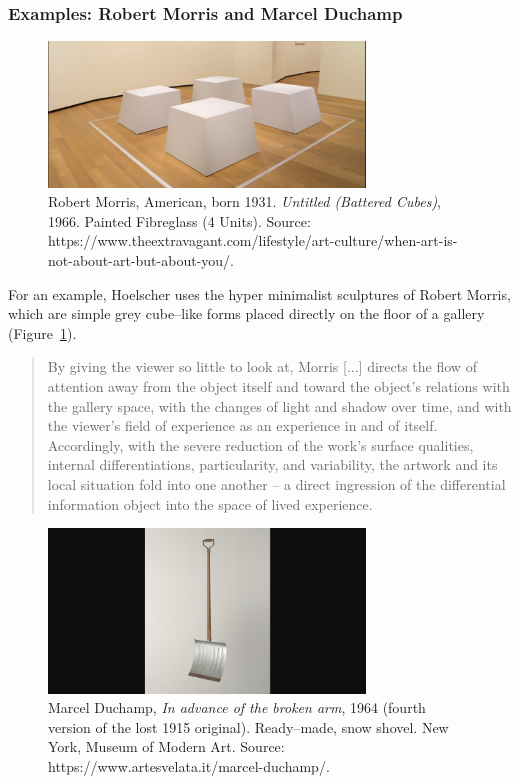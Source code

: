\documentclass[letter:wpaper]{article}
\begin{document}
    \subsubsection{Examples: Robert Morris and Marcel Duchamp}

    \begin{figure}[h]
        \includegraphics[width=3.31in]{robert-morris-cubes.png}
        \caption{Robert Morris, American, born 1931. \emph{Untitled (Battered Cubes)}, 1966. Painted Fibreglass (4 Units). Source: https://www.theextravagant.com/lifestyle/art-culture/when-art-is-not-about-art-but-about-you/.}
        \label{fig:robert-morris-cubes}
    \end{figure}

    For an example, Hoelscher uses the hyper minimalist sculptures of Robert Morris, which are simple grey cube–like forms placed directly on the floor of a gallery (Figure~\ref{fig:robert-morris-cubes}).

    \begin{quote}
        By giving the viewer so little to look at, Morris [...] directs the flow of attention away from the object itself and toward the object's relations with the gallery space, with the changes of light and shadow over time, and with the viewer's field of experience as an experience in and of itself. Accordingly, with the severe reduction of the work's surface qualities, internal differentiations, particularity, and variability, the artwork and its local situation fold into one another – a direct ingression of the differential information object into the space of lived experience. \citep[p.78]{HoelscherArtAsInfrmtn2021}
    \end{quote}

    \begin{figure}[h]
        \includegraphics[width=3.31in]{snow-shovel.png}
        \caption{Marcel Duchamp, \emph{In advance of the broken arm}, 1964 (fourth version of the lost 1915 original). Ready–made, snow shovel. New York, Museum of Modern Art. Source: https://www.artesvelata.it/marcel-duchamp/.}
        \label{fig:snow-shovel}
    \end{figure}
\end{document}
